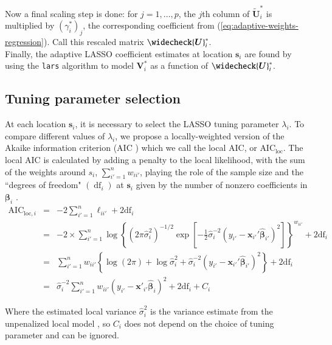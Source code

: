 \documentclass[authoryear, review, 11pt]{elsarticle}
\DeclareMathOperator*{\df}{\mbox{df}}
\begin{document}
	Now a final scaling step is done: for $j=1, \dots, p$, the $j$th column of $\tilde{\bm{U}}_i^*$ is multiplied by $\left(\gamma_i^*\right)_j$, the corresponding coefficient from (\ref{eq:adaptive-weights-regression}). Call this rescaled matrix $\widecheck{\bm{U}}_i^*$.\\
	
	Finally, the adaptive LASSO coefficient estimates at location $\bm{s}_i$ are found by using the \verb!lars! algorithm \citep{Efron:2004b} to model $\bm{V}_i^*$ as a function of $\widecheck{\bm{U}}_i^*$.

	\subsection{Tuning parameter selection}	
	At each location $\bm{s}_i$, it is necessary to select the LASSO tuning parameter $\lambda_i$. To compare different values of $\lambda_i$, we propose a locally-weighted version of the Akaike information criterion (AIC \citep{Akaike:1974}) which we call the local AIC, or $\mbox{AIC}_{\text{loc}}$. The local AIC is calculated by adding a penalty to the local likelihood, with the sum of the weights around $s_i$, $\sum_{i'=1}^n w_{ii'}$, playing the role of the sample size and the ``degrees of freedom" $\left( \df_i \right)$ at $\bm{s}_i$ given by the number of nonzero coefficients in $\bm{\beta}_i$ \citep{Zou:2007}.\\
	
	\begin{eqnarray}
		\mbox{AIC}_{\text{loc}, i} &=& -2 \sum_{i'=1}^n \ell_{ii'}  + 2 \mbox{df}_i\\
		&=& -2 \times \sum_{i'=1}^n \log \left\{ \left(2 \pi \hat{\sigma}_i^2\right)^{-1/2} \exp \left[-\frac{1}{2} \hat{\sigma}_i^{-2} \left(y_{i'} - \bm{x}_{i'}' \hat{\bm{\beta}}_{i'} \right)^2\right] \right\}^{w_{ii'}} + 2\mbox{df}_i\\
		&=& \sum_{i'=1}^n w_{ii'} \left\{ \log \left(2 \pi \right) + \log \hat{\sigma}_i^2 + \hat{\sigma}_i^{-2} \left(y_{i'} - \bm{x}_{i'}' \hat{\bm{\beta}}_{i'} \right)^2 \right\} + 2\mbox{df}_i \\
		&=& \hat{\sigma}_i^{-2} \sum_{i'=1}^n w_{ii'} \left( y_{i'} - \bm{x}'_{i'} \hat{\bm{\beta}}_i \right)^2 + 2 \mbox{df}_i + C_i
	\end{eqnarray}	
	
	Where the estimated local variance $\hat{\sigma}_i^2$ is the variance estimate from the unpenalized local model \citep{Zou:2007}, so $C_i$ does not depend on the choice of tuning parameter and can be ignored.
	
\end{document}
